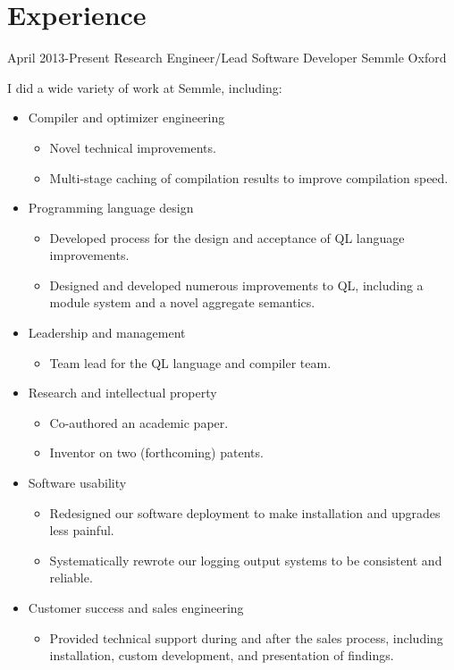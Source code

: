\documentclass[12pt,a4paper,sans]{moderncv}
\begin{document}
\maketitle

\section{Experience}

\cventry
{April 2013-Present}
{Research Engineer/Lead Software Developer}
{Semmle}
{Oxford}
{}
{
  I did a wide variety of work at Semmle, including:
  \begin{itemize}
  \item Compiler and optimizer engineering
    \begin{itemize}
    \item Novel technical improvements.
    \item Multi-stage caching of compilation results to improve compilation speed.
    \end{itemize}
  \item Programming language design
    \begin{itemize}
    \item Developed process for the design and acceptance of QL language improvements.
    \item Designed and developed numerous improvements to QL, including a module
      system and a novel aggregate semantics.
    \end{itemize}
  \item Leadership and management
    \begin{itemize}
    \item Team lead for the QL language and compiler team.
    \end{itemize}
  \item Research and intellectual property
    \begin{itemize}
    \item Co-authored an academic paper.
    \item Inventor on two (forthcoming) patents.
    \end{itemize}
  \item Software usability
    \begin{itemize}
    \item Redesigned our software deployment to make installation and
      upgrades less painful.
    \item Systematically rewrote our logging output systems to be consistent and reliable.
    \end{itemize}
  \item Customer success and sales engineering
    \begin{itemize}
    \item Provided technical support during and after the sales process, including
      installation, custom development, and presentation of findings.
    \end{itemize}
  \end{itemize}
}
\end{document}
